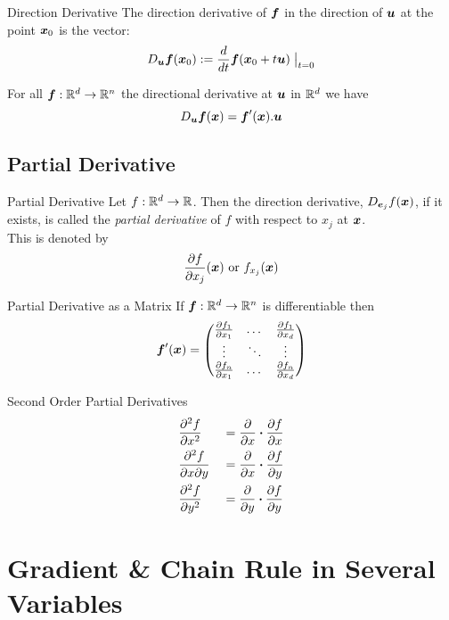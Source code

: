 \documentclass[11pt,a4paper]{article}
\begin{document}
\subtitle{Defintion 10.3 - }{Direction Derivative}
The direction derivative of $\boldsymbol{f}$ in the direction of $\boldsymbol{u}$ at the point $\boldsymbol{x}_0$ is the vector:
$$D_{\boldsymbol{u}}\boldsymbol{f}(\boldsymbol{x}_0) := \frac{d}{dt} \boldsymbol{f}(\boldsymbol{x}_0 + t\boldsymbol{u})\bigm|_{t=0}$$

\subtitle{Theorem 10.4}{}
For all $\boldsymbol{f} : \mathbb{R}^d \to \mathbb{R}^n$ the directional derivative at $\boldsymbol{u}$ in $\mathbb{R}^d$ we have
$$D_{\boldsymbol{u}} \boldsymbol{f} (\boldsymbol{x}) = \boldsymbol{f}'(\boldsymbol{x}).\boldsymbol{u}$$

\subsection{Partial Derivative}

\subtitle{Defintion 10.5 - }{Partial Derivative}
Let $f : \mathbb{R}^d \to \mathbb{R}$. Then the direction derivative, $D_{\boldsymbol{e}_j}f(\boldsymbol{x})$, if it exists, is called the \textit{partial derivative} of $f$ with respect to $x_j$ at $\boldsymbol{x}$.\\
This is denoted by $$\frac{\partial f}{\partial x_j}(\boldsymbol{x}) \mathrm{\ or\ } f_{x_j}(\boldsymbol{x})$$

\subtitle{Proposition 10.6 - }{Partial Derivative as a Matrix}
If $\boldsymbol{f} : \mathbb{R}^d \to \mathbb{R}^n$ is differentiable then
$$\boldsymbol{f}'(\boldsymbol{x}) = \begin{pmatrix}
\frac{\partial f_1}{\partial x_1} & \dots & \frac{\partial f_1}{\partial x_d} \\
\vdots & \ddots & \vdots \\
\frac{\partial f_n}{\partial x_1} & \dots & \frac{\partial f_n}{\partial x_d}
\end{pmatrix}$$

\subtitle{Remark 10.7 - }{Second Order Partial Derivatives}
\begin{alignat*}{2}
  &\frac{\partial^2 f}{\partial x^2} &&= \frac{\partial}{\partial x} \boldsymbol{\cdot} \frac{\partial f}{\partial x} \\
  &\frac{\partial^2 f}{\partial x \partial y} &&= \frac{\partial}{\partial x} \boldsymbol{\cdot} \frac{\partial f}{\partial y} \\
  &\frac{\partial^2 f}{\partial y^2} &&= \frac{\partial}{\partial y} \boldsymbol{\cdot} \frac{\partial f}{\partial y}
\end{alignat*}

\section{Gradient \& Chain Rule in Several Variables}
%
\end{document}
